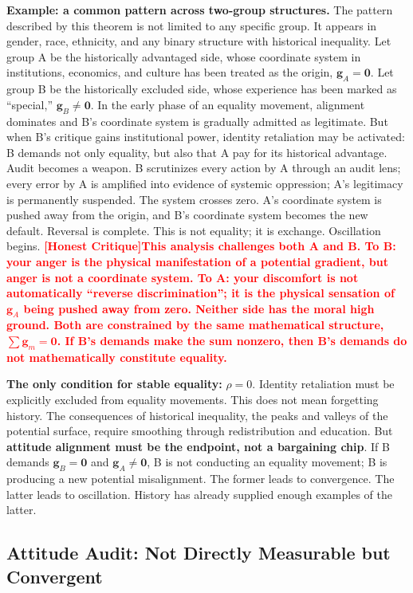 \documentclass[12pt,a4paper]{article}
\theoremstyle{remark}
\newcommand{\honestcrit}[1]{%
    \textcolor{red}{\textbf{[Honest Critique]#1}}%
}
\begin{document}
\textbf{Example: a common pattern across two-group structures.} The pattern described by this theorem is not limited to any specific group. It appears in gender, race, ethnicity, and any binary structure with historical inequality. Let group A be the historically advantaged side, whose coordinate system in institutions, economics, and culture has been treated as the origin, $\mathbf{g}_A = \mathbf{0}$. Let group B be the historically excluded side, whose experience has been marked as ``special,'' $\mathbf{g}_B \neq \mathbf{0}$. In the early phase of an equality movement, alignment dominates and B's coordinate system is gradually admitted as legitimate. But when B's critique gains institutional power, identity retaliation may be activated: B demands not only equality, but also that A pay for its historical advantage. Audit becomes a weapon. B scrutinizes every action by A through an audit lens; every error by A is amplified into evidence of systemic oppression; A's legitimacy is permanently suspended. The system crosses zero. A's coordinate system is pushed away from the origin, and B's coordinate system becomes the new default. Reversal is complete. This is not equality; it is exchange. Oscillation begins.\honestcrit{This analysis challenges both A and B. To B: your anger is the physical manifestation of a potential gradient, but anger is not a coordinate system. To A: your discomfort is not automatically ``reverse discrimination''; it is the physical sensation of $\mathbf{g}_A$ being pushed away from zero. Neither side has the moral high ground. Both are constrained by the same mathematical structure, $\sum\mathbf{g}_m = \mathbf{0}$. If B's demands make the sum nonzero, then B's demands do not mathematically constitute equality.}

\textbf{The only condition for stable equality:} $\rho = 0$. Identity retaliation must be explicitly excluded from equality movements. This does not mean forgetting history. The consequences of historical inequality, the peaks and valleys of the potential surface, require smoothing through redistribution and education. But \textbf{attitude alignment must be the endpoint, not a bargaining chip}. If B demands $\mathbf{g}_B = \mathbf{0}$ and $\mathbf{g}_A \neq \mathbf{0}$, B is not conducting an equality movement; B is producing a new potential misalignment. The former leads to convergence. The latter leads to oscillation. History has already supplied enough examples of the latter.

\subsection{Attitude Audit: Not Directly Measurable but Convergent}
\end{document}
